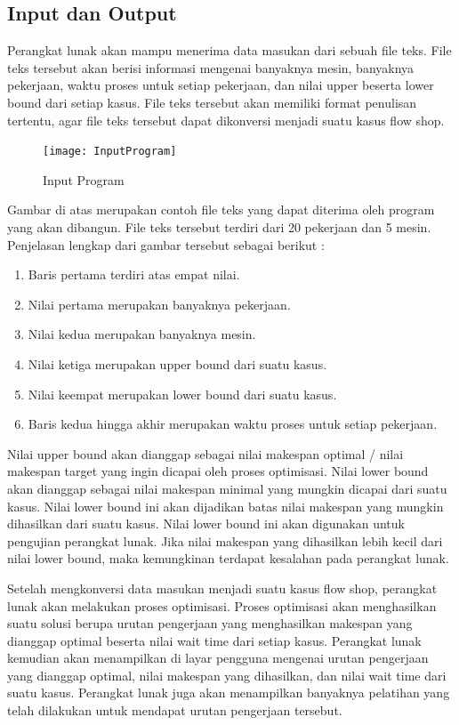 	\subsection{Input dan Output}
	
	Perangkat lunak akan mampu menerima data masukan dari sebuah file teks. File teks tersebut akan
	berisi informasi mengenai banyaknya mesin, banyaknya pekerjaan, waktu proses untuk setiap pekerjaan, dan 
	nilai upper beserta lower bound dari setiap kasus.
	File teks tersebut akan memiliki format penulisan tertentu, agar file teks tersebut dapat dikonversi menjadi 
	suatu kasus flow shop.
	\begin{figure}[H]
		\centering
		\texttt{[image: InputProgram]}
		\caption[Input Program]{Input Program}
		\label{fig:inputprogram}
	\end{figure}
	Gambar di atas merupakan contoh file teks yang dapat diterima oleh program yang akan dibangun. File teks 
	tersebut terdiri dari 20 pekerjaan dan 5 mesin. Penjelasan lengkap dari gambar tersebut sebagai berikut :
	\begin{enumerate}
		\item Baris pertama terdiri atas empat nilai.
		\item Nilai pertama merupakan banyaknya pekerjaan.
		\item Nilai kedua merupakan banyaknya mesin.
		\item Nilai ketiga merupakan upper bound dari suatu kasus.
		\item Nilai keempat merupakan lower bound dari suatu kasus.
		\item Baris kedua hingga akhir merupakan waktu proses untuk setiap pekerjaan.
	\end{enumerate}
	Nilai upper bound akan dianggap sebagai nilai makespan optimal / nilai makespan target yang
	ingin dicapai oleh proses optimisasi. Nilai lower bound akan dianggap sebagai nilai makespan minimal
	yang mungkin dicapai dari suatu kasus. Nilai lower bound ini akan dijadikan batas nilai
	makespan yang mungkin dihasilkan dari suatu kasus. Nilai lower bound ini akan digunakan untuk
	pengujian perangkat lunak. Jika nilai makespan yang dihasilkan lebih kecil dari nilai lower bound,
	maka kemungkinan terdapat kesalahan pada perangkat lunak.
	
	Setelah mengkonversi data masukan menjadi suatu kasus flow shop, perangkat lunak
	akan melakukan proses optimisasi. Proses optimisasi akan menghasilkan suatu solusi berupa urutan
	pengerjaan yang menghasilkan makespan yang dianggap optimal beserta nilai wait time dari setiap kasus. 
	Perangkat lunak kemudian akan
	menampilkan di layar pengguna mengenai urutan pengerjaan yang dianggap optimal, nilai
	makespan yang dihasilkan, dan nilai wait time dari suatu kasus. Perangkat lunak juga akan menampilkan 
	banyaknya pelatihan yang telah dilakukan untuk mendapat urutan pengerjaan tersebut.

